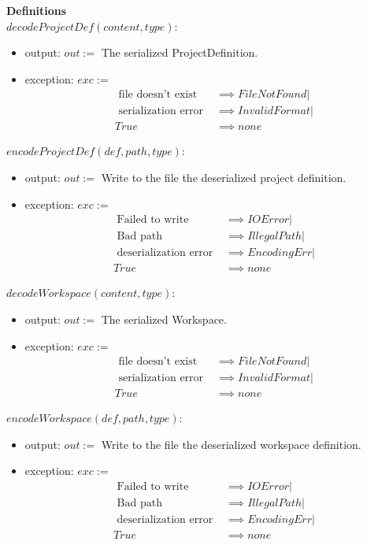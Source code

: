 \documentclass[11pt]{article}
\begin{document}
  \vspace{2em}
  \textbf{Definitions}\\

  $decodeProjectDef(content, type):$
  \begin{itemize}
  \item output: $out :=$ The serialized ProjectDefinition.
  \item exception: $exc :=$
    \begin{align*}
      \text{ file doesn't exist } &\implies FileNotFound|\\
      \text{ serialization error } &\implies InvalidFormat|\\
      True &\implies none
    \end{align*}
  \end{itemize}

  \vspace{1em}
  $encodeProjectDef(def, path, type):$
  \begin{itemize}
  \item output: $out :=$ Write to the file the deserialized project definition.
  \item exception: $exc :=$
    \begin{align*}
      \text{ Failed to write } &\implies IOError|\\
      \text{ Bad path } &\implies IllegalPath|\\
      \text{ deserialization error } &\implies EncodingErr|\\
      True &\implies none
    \end{align*}
  \end{itemize}
  \vspace{1em}
  $decodeWorkspace(content, type):$
  \begin{itemize}
  \item output: $out :=$ The serialized Workspace.
  \item exception: $exc :=$
    \begin{align*}
      \text{ file doesn't exist } &\implies FileNotFound|\\
      \text{ serialization error } &\implies InvalidFormat|\\
      True &\implies none
    \end{align*}
  \end{itemize}
  \vspace{1em}
  $encodeWorkspace(def, path, type):$
  \begin{itemize}
  \item output: $out :=$ Write to the file the deserialized workspace definition.
  \item exception: $exc :=$
    \begin{align*}
      \text{ Failed to write } &\implies IOError|\\
      \text{ Bad path } &\implies IllegalPath|\\
      \text{ deserialization error } &\implies EncodingErr|\\
      True &\implies none
    \end{align*}
  \end{itemize}
\end{document}
